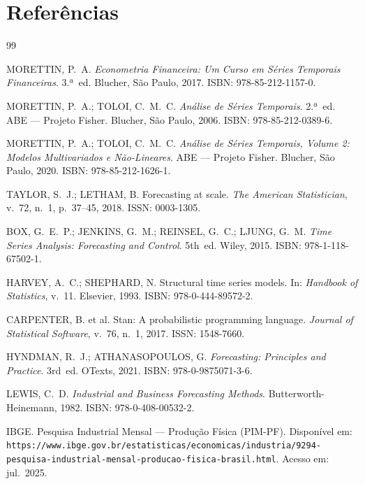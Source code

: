 \documentclass[12pt, a4paper]{article}
\begin{document}
\newpage
\section*{Referências}

\begin{thebibliography}{99}


MORETTIN, P.~A.
\textit{Econometria Financeira: Um Curso em Séries Temporais
Financeiras}. 3.ª~ed. Blucher, São Paulo, 2017.
ISBN: 978-85-212-1157-0.

MORETTIN, P.~A.; TOLOI, C.~M.~C.
\textit{Análise de Séries Temporais}. 2.ª~ed.
ABE --- Projeto Fisher. Blucher, São Paulo, 2006.
ISBN: 978-85-212-0389-6.

MORETTIN, P.~A.; TOLOI, C.~M.~C.
\textit{Análise de Séries Temporais, Volume 2: Modelos
Multivariados e Não-Lineares}. ABE --- Projeto Fisher. Blucher,
São Paulo, 2020.
ISBN: 978-85-212-1626-1.



TAYLOR, S.~J.; LETHAM, B.
Forecasting at scale.
\textit{The American Statistician}, v.~72, n.~1, p.~37--45, 2018.
ISSN: 0003-1305.

BOX, G.~E.~P.; JENKINS, G.~M.; REINSEL, G.~C.; LJUNG, G.~M.
\textit{Time Series Analysis: Forecasting and Control}.
5th~ed. Wiley, 2015.
ISBN: 978-1-118-67502-1.

HARVEY, A.~C.; SHEPHARD, N.
Structural time series models. In: \textit{Handbook of
Statistics}, v.~11. Elsevier, 1993.
ISBN: 978-0-444-89572-2.

CARPENTER, B. et al.
Stan: A probabilistic programming language.
\textit{Journal of Statistical Software}, v.~76, n.~1, 2017.
ISSN: 1548-7660.

HYNDMAN, R.~J.; ATHANASOPOULOS, G.
\textit{Forecasting: Principles and Practice}. 3rd~ed. OTexts,
2021.
ISBN: 978-0-9875071-3-6.

LEWIS, C.~D.
\textit{Industrial and Business Forecasting Methods}.
Butterworth-Heinemann, 1982.
ISBN: 978-0-408-00532-2.

IBGE. Pesquisa Industrial Mensal --- Produção Física (PIM-PF).
Disponível em:
\nolinkurl{https://www.ibge.gov.br/estatisticas/economicas/industria/9294-pesquisa-industrial-mensal-producao-fisica-brasil.html}.
Acesso em: jul.\ 2025.

\end{thebibliography}
\end{document}
